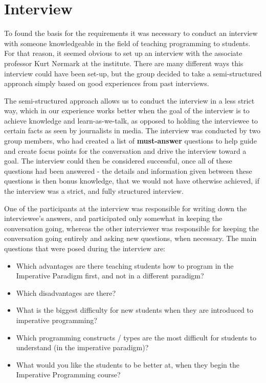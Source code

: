 \section{Interview}
\label{sec:interview}

To found the basis for the requirements it was necessary to conduct an interview with someone knowledgeable in the field of teaching programming to 
students. For that reason, it seemed obvious to set up an interview with the associate professor Kurt N{\o}rmark at the institute. There are many 
different ways this interview could have been set-up, but the group decided to take a semi-structured approach simply based on good experiences from 
past interviews. 


The semi-structured approach allows us to conduct the interview in a less strict way, which in our experience works better when the goal of the 
interview is to achieve knowledge and learn-as-we-talk, as opposed to holding the interviewee to certain facts as seen by journalists in media. The 
interview was conducted by two group members, who had created a list of \textbf{must-answer} questions to help guide and create focus points for the 
conversation and drive the interview toward a goal. The interview could then be considered successful, once all of these questions had been answered - 
the details and information given between these questions is then bonus knowledge, that we would not have otherwise achieved, if the interview was a 
strict, and fully structured interview.

One of the participants at the interview was responsible for writing down the interviewee's answers, and participated only somewhat in keeping the 
conversation going, whereas the other interviewer was responsible for keeping the conversation going entirely and asking new questions, when necessary. 
The main questions that were posed during the interview are:

\begin{itemize}
	\item Which advantages are there teaching students how to program in the Imperative Paradigm first, and not in a different paradigm?
	\item Which disadvantages are there?
	\item What is the biggest difficulty for new students when they are introduced to imperative programming?
	\item Which programming constructs / types are the most difficult for students to understand (in the imperative paradigm)?
	\item What would you like the students to be better at, when they begin the Imperative Programming course?
\end{itemize}


